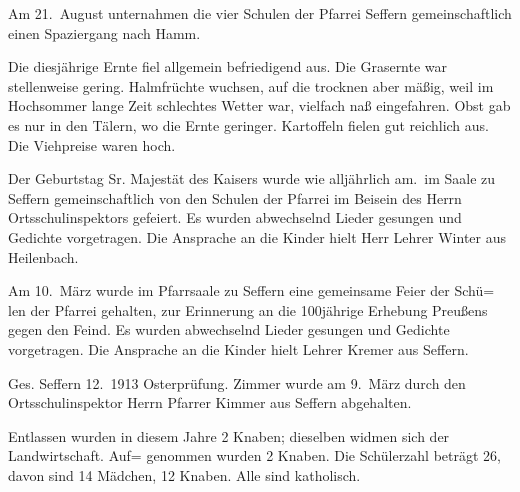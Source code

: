 

\pstart
Am 21.\ August unternahmen die vier Schulen der Pfarrei Seffern\ob
gemeinschaftlich einen Spaziergang nach Hamm\unsicher.

\trenner

\pend
{}
\pstart

Die diesjährige Ernte fiel allgemein befriedigend aus. Die\ob
Grasernte war stellenweise gering. Halmfrüchte wuchsen, auf\ob
die trocknen aber mäßig, weil im Hochsommer lange Zeit\ob
schlechtes Wetter war, vielfach naß eingefahren. Obst gab\ob
es nur in den Tälern, wo die Ernte geringer. Kartoffeln\ob
fielen gut reichlich aus. Die Viehpreise waren hoch.

\trenner

\pend
{}
\pstart

Der Geburtstag Sr. Majestät des Kaisers wurde wie alljährlich am.\ im Saale zu Seffern gemeinschaftlich von den Schulen der Pfarrei\ob
im Beisein des Herrn Ortsschulinspektors gefeiert. Es wurden\ob
abwechselnd Lieder gesungen und Gedichte vorgetragen. Die\ob
Ansprache an die Kinder hielt Herr Lehrer Winter aus Heilenbach.

\trenner

\pend
{}
\pstart

Am 10.\ März wurde im Pfarrsaale zu Seffern eine gemeinsame Feier der Schü=\ob
len der Pfarrei gehalten, zur Erinnerung an die 100jährige Erhebung Preußens gegen den Feind. Es wurden abwechselnd Lieder gesungen und Gedichte\ob
vorgetragen. Die Ansprache an die Kinder hielt Lehrer Kremer aus Seffern.

Ges. Seffern 12.\ 1913                  Osterprüfung.\ob
Zimmer\ob
wurde am 9.\ März durch den Ortsschulinspektor Herrn Pfarrer Kimmer aus Seffern\ob
abgehalten.

\pend
{}
\pstart

Entlassen wurden in diesem Jahre 2 Knaben; dieselben widmen sich der Landwirtschaft. Auf=\ob
genommen wurden 2 Knaben. Die Schülerzahl beträgt 26, davon sind 14 Mädchen, 12 Knaben.\ob
Alle sind katholisch.
\pend
